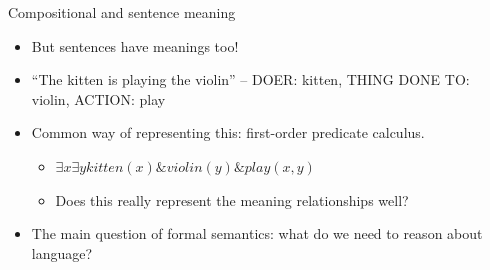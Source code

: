 \documentclass{beamer}
\begin{document}
\begin{frame}{Compositional and sentence meaning}
  \begin{itemize}
  \item But sentences have meanings too! \pause
  \item ``The kitten is playing the violin'' -- DOER: kitten, THING DONE TO: violin, ACTION: play\pause
  \item Common way of representing this: first-order predicate calculus.\pause
    \begin{itemize}
    \item $\exists x \exists y \mathit{kitten}(x) \& \mathit{violin}(y) \& \mathit{play}(x, y)$\pause
    \item Does this really represent the meaning relationships well?\pause
    \end{itemize}
  \item The main question of formal semantics: what do we need to reason about language?
  \end{itemize}
\end{frame}


\end{document}
